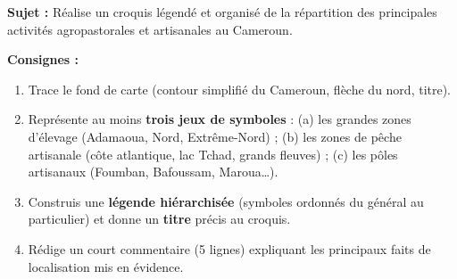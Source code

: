 \documentclass[11pt]{article}
\begin{document}
\begin{exercice}
\textbf{Sujet :} Réalise un croquis légendé et organisé de la répartition des principales activités agropastorales et artisanales au Cameroun.

\textbf{Consignes :}
\begin{enumerate}
\item Trace le fond de carte (contour simplifié du Cameroun, flèche du nord, titre).
\item Représente au moins \textbf{trois jeux de symboles} : (a) les grandes zones d'élevage (Adamaoua, Nord, Extrême-Nord) ; (b) les zones de pêche artisanale (côte atlantique, lac Tchad, grands fleuves) ; (c) les pôles artisanaux (Foumban, Bafoussam, Maroua\ldots).
\item Construis une \textbf{légende hiérarchisée} (symboles ordonnés du général au particulier) et donne un \textbf{titre} précis au croquis.
\item Rédige un court commentaire (5 lignes) expliquant les principaux faits de localisation mis en évidence.
\end{enumerate}
\end{exercice}
\end{document}
